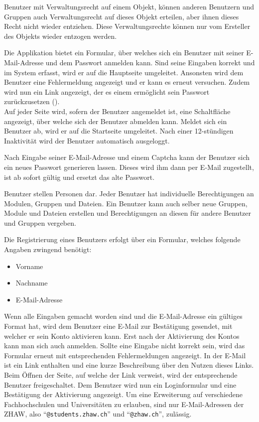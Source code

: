 Benutzer mit Verwaltungsrecht auf einem Objekt, können anderen Benutzern und Gruppen auch Verwaltungsrecht auf dieses Objekt erteilen, aber ihnen dieses Recht nicht wieder entziehen. Diese Verwaltungsrechte können nur vom Ersteller des Objekts wieder entzogen werden.


Die Applikation bietet ein Formular, über welches sich ein Benutzer mit seiner E-Mail-Adresse und dem Passwort anmelden kann. Sind seine Eingaben korrekt und im System erfasst, wird er auf die Hauptseite umgeleitet. Ansonsten  wird dem Benutzer eine Fehlermeldung angezeigt und er kann es erneut versuchen. Zudem wird nun ein Link angezeigt, der es einem ermöglicht sein Passwort zurückzusetzen ().\\

Auf jeder Seite wird, sofern der Benutzer angemeldet ist, eine Schaltfläche angezeigt, über welche sich der Benutzer abmelden kann. Meldet sich ein Benutzer ab, wird er auf die Startseite umgeleitet. Nach einer 12-stündigen Inaktivität wird der Benutzer automatisch ausgeloggt.

Nach Eingabe seiner E-Mail-Adresse und einem \gls{Captcha} kann der Benutzer sich ein neues Passwort generieren lassen. Dieses wird ihm dann per E-Mail zugestellt, ist ab sofort gültig und ersetzt das alte Passwort.

Benutzer stellen Personen dar. Jeder Benutzer hat individuelle Berechtigungen an Modulen, Gruppen und Dateien. Ein Benutzer kann auch selber neue Gruppen, Module und Dateien erstellen und Berechtigungen an diesen für andere Benutzer und Gruppen vergeben.

Die Registrierung eines Benutzers erfolgt über ein Formular, welches folgende Angaben zwingend benötigt:
\begin{itemize}
\item Vorname
\item Nachname
\item E-Mail-Adresse
\end{itemize}
Wenn alle Eingaben gemacht worden sind und die E-Mail-Adresse ein gültiges Format hat, wird dem Benutzer eine E-Mail zur Bestätigung gesendet, mit welcher er sein Konto aktivieren kann. Erst nach der Aktivierung des Kontos kann man sich auch anmelden. Sollte eine Eingabe nicht korrekt sein, wird das Formular erneut mit entsprechenden Fehlermeldungen angezeigt. In der E-Mail ist ein Link enthalten und eine kurze Beschreibung über den Nutzen dieses Links. Beim Öffnen der Seite, auf welche der Link verweist, wird der entsprechende Benutzer freigeschaltet. Dem Benutzer wird nun ein Loginformular und eine Bestätigung der Aktivierung angezeigt.
Um eine Erweiterung auf verschiedene Fachhochschulen und Universitäten zu erlauben, sind nur E-Mail-Adressen der ZHAW, also "`\texttt{@students.zhaw.ch}"' und "`\texttt{@zhaw.ch}"', zulässig.

